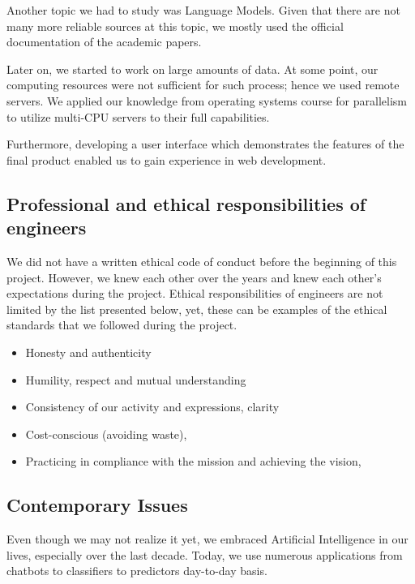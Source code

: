 \documentclass{mefsdp}
\begin{document}
	Another topic we had to study was Language Models. Given that there are not many more reliable sources at this topic, we mostly used the official documentation of the academic papers.\newline \par
	
	Later on, we started to work on large amounts of data. At some point, our computing resources were not sufficient for such process; hence we used remote servers. We applied our knowledge from operating systems course for parallelism to utilize multi-CPU servers to their full capabilities. \newline \par
	
	Furthermore, developing a user interface which demonstrates the features of the final product enabled us to gain experience in web development.  
	
	\subsection{Professional and ethical responsibilities of engineers}
	
	We did not have a written ethical code of conduct before the beginning of this project. However, we knew each other over the years and knew each other's expectations during the project.
	Ethical responsibilities of engineers are not limited by the list presented below, yet, these can be examples of the ethical standards that we followed during the project.
	
	\begin{itemize}
		\item	Honesty and authenticity
		\item	Humility, respect and mutual understanding
		\item	Consistency of our activity and expressions, clarity
		\item	Cost-conscious (avoiding waste),
		\item	Practicing in compliance with the mission and achieving the vision,
	\end{itemize}
	
	
	\subsection{Contemporary Issues}
	
	Even though we may not realize it yet, we embraced Artificial Intelligence in our lives, especially over the last decade. Today, we use numerous applications from chatbots to classifiers to predictors day-to-day basis. \newline \par
	
\end{document}

